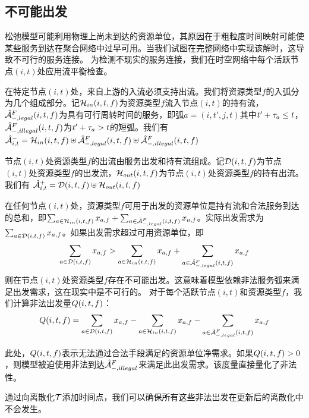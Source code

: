 \subsection{不可能出发}
松弛模型可能利用物理上尚未到达的资源单位，其原因在于粗粒度时间映射可能使某些服务到达在聚合网络中过早可用。当我们试图在完整网络中实现该解时，这导致不可行的服务连接。
为检测不现实的服务连接，我们在时空网络中每个活跃节点$(i, t)$处应用流平衡检查。

在特定节点$(i, t)$处，来自上游的入流必须支持出流。我们将资源类型$f$的入弧分为几个组成部分。记$\holdingArcIn(i, t, f)$为资源类型$f$流入节点$(i, t)$的持有流，$\flightArc[-,legal](i, t, f)$为具有可行周转时间的服务，即弧$a = (i, t', j, t)$其中$t' + \travelTime_a \le t$，$\flightArc[-,illegal](i, t, f)$为$t' + \travelTime_a > t$的短弧。我们有
$\inArcSet{i,t}=\holdingArcIn(i, t, f)\uplus \flightArc[-,legal](i, t, f) \uplus \flightArc[-,illegal](i, t, f)$

节点$(i, t)$处资源类型$f$的出流由服务出发和持有流组成。记$\departArc(i, t, f)$为节点$(i, t)$处资源类型$f$的出发流，$\holdingArcOut(i, t, f)$为节点$(i, t)$处资源类型$f$的持有出流。我们有
$\outArcSet{i,t}=\departArc(i, t, f)\uplus \holdingArcOut(i, t, f)$

在任何节点$(i, t)$处，资源类型$f$可用于出发的资源单位是持有流和合法服务到达的总和，即$\sum_{a\in\holdingArcIn(i, t, f)}\fleetAssignVar_{a,f} + \sum_{a\in\flightArc[-,legal](i, t, f)}\fleetAssignVar_{a,f}$。实际出发需求为$\sum_{a\in\departArc(i, t, f)}\fleetAssignVar_{a,f}$。如果出发需求超过可用资源单位，即
\begin{equation}
    \sum_{a\in\departArc(i, t, f)}\fleetAssignVar_{a,f} > \sum_{a\in\holdingArcIn(i, t, f)}\fleetAssignVar_{a,f} + \sum_{a\in\flightArc[-,legal](i, t, f)}\fleetAssignVar_{a,f}
\end{equation}
则在节点$(i, t)$处资源类型$f$存在不可能出发。这意味着模型依赖非法服务弧来满足出发需求，这在现实中是不可行的。
对于每个活跃节点$(i, t)$和资源类型$f$，我们计算非法出发量$\impDeparts(i,t,f)$：
\begin{equation}
    \impDeparts(i,t,f) = \sum_{a\in\departArc(i, t, f)}\fleetAssignVar_{a,f} - \sum_{a\in\holdingArcIn(i, t, f)}\fleetAssignVar_{a,f} - \sum_{a\in\flightArc[-,legal](i, t, f)}\fleetAssignVar_{a,f}
\end{equation}

此处，$\impDeparts(i,t,f)$表示无法通过合法手段满足的资源单位净需求。如果$\impDeparts(i,t,f) > 0$，则模型被迫使用非法到达$\flightArc[-,illegal]$来满足此出发需求。该度量直接量化了非法性。

通过向离散化$\discretization$添加时间点，我们可以确保所有这些非法出发在更新后的离散化中不会发生。

